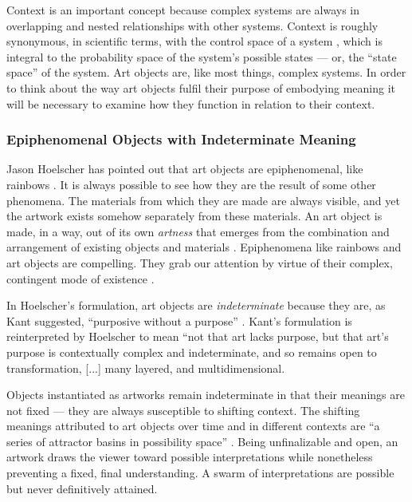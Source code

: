 \documentclass[letterpaper]{article}
\begin{document}
    Context is an important concept because complex systems are always in overlapping and nested relationships with other systems. Context is roughly synonymous, in scientific terms, with the control space of a system \citep[p.130]{DeLandaAssmblgThry2016}, which is integral to the probability space of the system's possible states — or, the “state space” of the system. Art objects are, like most things, complex systems. In order to think about the way art objects fulfil their purpose of embodying meaning it will be necessary to examine how they function in relation to their context.
    
    \subsubsection{Epiphenomenal Objects with Indeterminate Meaning}

    Jason Hoelscher has pointed out that art objects are epiphenomenal, like rainbows \citep[p.17]{HoelscherArtAsInfrmtn2021}. It is always possible to see how they are the result of some other phenomena. The materials from which they are made are always visible, and yet the artwork exists somehow separately from these materials. An art object is made, in a way, out of its own \emph{artness} that emerges from the combination and arrangement of existing objects and materials \citep[p.2]{HoelscherThPtcsOfPhsSpc2014}. Epiphenomena like rainbows and art objects are compelling. They grab our attention by virtue of their complex, contingent mode of existence \citep[p.18]{HoelscherThPtcsOfPhsSpc2014}. 
    
    In Hoelscher's formulation, art objects are \emph{indeterminate} because they are, as Kant suggested, “purposive without a purpose” \citep[p.57]{KantCrtqOfJdgmnt}. Kant's formulation is reinterpreted by Hoelscher to mean “not that art lacks purpose, but that art's purpose is contextually complex and indeterminate, and so remains open to transformation, [...] many layered, and multidimensional.\citep[p.25]{HoelscherThPtcsOfPhsSpc2014}

    Objects instantiated as artworks remain indeterminate in that their meanings are not fixed — they are always susceptible to shifting context. The shifting meanings attributed to art objects over time and in different contexts are “a series of attractor basins in possibility space” \citep[p.4]{HoelscherThPtcsOfPhsSpc2014}. Being unfinalizable and open, an artwork draws the viewer toward possible interpretations while nonetheless preventing a fixed, final understanding. A swarm of interpretations are possible but never definitively attained. \citep[p.12]{HoelscherThPtcsOfPhsSpc2014}
\end{document}
